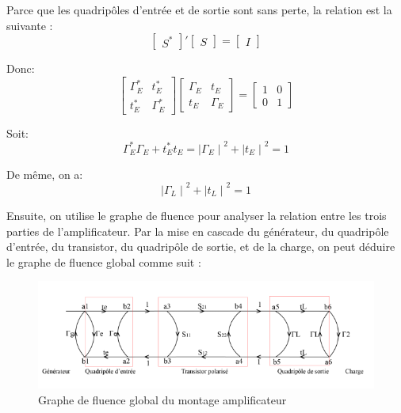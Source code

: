 \documentclass[french]{article}
\begin{document}
Parce que les quadripôles d'entrée et de sortie sont sans perte, la relation est la suivante :
\begin{equation}
	{\begin{bmatrix}
		S^\ast 
	\end{bmatrix}}'
	\begin{bmatrix}
		S
	\end{bmatrix}=
	\begin{bmatrix}
		I
	\end{bmatrix}
\end{equation}

Donc:
\begin{equation}
	\begin{bmatrix}
		\Gamma_{E}^\ast & t_{E}^\ast\\
		t_{E}^\ast & \Gamma_{E}^\ast
	\end{bmatrix}
	\begin{bmatrix}
		\Gamma_{E} & t_{E}\\
		t_{E} & \Gamma_{E}
	\end{bmatrix}=
	\begin{bmatrix}
		1 & 0\\
		0 & 1
	\end{bmatrix}
\end{equation}

Soit:
\begin{equation}
	\Gamma_{E}^{\ast}\Gamma_{E}+t_{E}^{\ast}t_{E}
	={\mid \Gamma_{E}\mid}^2+{\mid t_{E}\mid}^2
	=1
	\label{eq2}
\end{equation}

De même, on a:
\begin{equation}
	{\mid \Gamma_{L}\mid}^2+{\mid t_{L}\mid}^2
	=1
	\label{eq3}
\end{equation}

Ensuite, on utilise le graphe de fluence pour analyser la relation entre les trois parties de l'amplificateur. Par la mise en cascade du générateur, du quadripôle d’entrée, du transistor, du quadripôle de sortie, et de la charge, on peut déduire le graphe de fluence global comme suit :

\begin{figure}[H]
	\centering
	\includegraphics[width=0.9\linewidth]{../5SynthAmp/flux_global}
	\caption{Graphe de fluence global du montage amplificateur}
	\label{fig:flux_global}
\end{figure}
\end{document}
